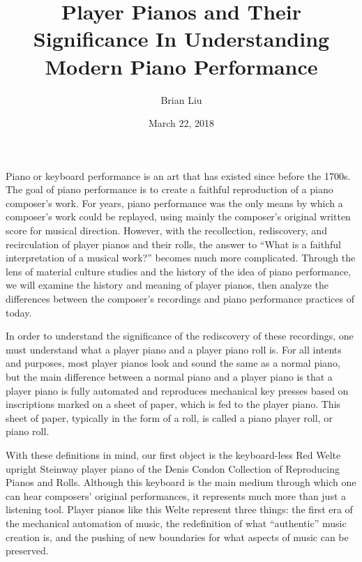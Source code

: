 \documentclass[titlepage,14pt]{article}
\title{Player Pianos and Their Significance In Understanding Modern Piano Performance}
\author{Brian Liu}
\date{March 22, 2018}
\begin{document}
\maketitle


\large
\begin{doublespace}

Piano or keyboard performance is an art that has existed since before the 1700s. The goal of piano performance is to create a faithful reproduction of a piano composer's work. For years, piano performance was the only means by which a composer's work could be replayed, using mainly the composer's original written score for musical direction.
However, with the recollection, rediscovery, and recirculation of player pianos and their rolls, the answer to ``What is a faithful interpretation of a musical work?'' becomes much more complicated. Through the lens of material culture studies and the history of the idea of piano performance, we will examine the history and meaning of player pianos, then analyze the differences between the composer's recordings and piano performance practices of today.


In order to understand the significance of the rediscovery of these recordings, one must understand what a player piano and a player piano roll is. For all intents and purposes, most player pianos look and sound the same as a normal piano, but the main difference between a normal piano and a player piano is that a player piano is fully automated and reproduces mechanical key presses based on inscriptions marked on a sheet of paper, which is fed to the player piano. This sheet of paper, typically in the form of a roll, is called a piano player roll, or piano roll.\autocite{playerpianoproject}

With these definitions in mind, our first object is the keyboard-less Red Welte upright Steinway player piano of the Denis Condon Collection of Reproducing Pianos and Rolls. \autocite{redwelte} Although this keyboard is the main medium through which one can hear composers' original performances, it represents much more than just a listening tool. Player pianos like this Welte represent three things: the first era of the mechanical automation of music, the redefinition of what ``authentic'' music creation is, and the pushing of new boundaries for what aspects of music can be preserved. \autocite{playerpiano}


\end{doublespace}
\end{document}
